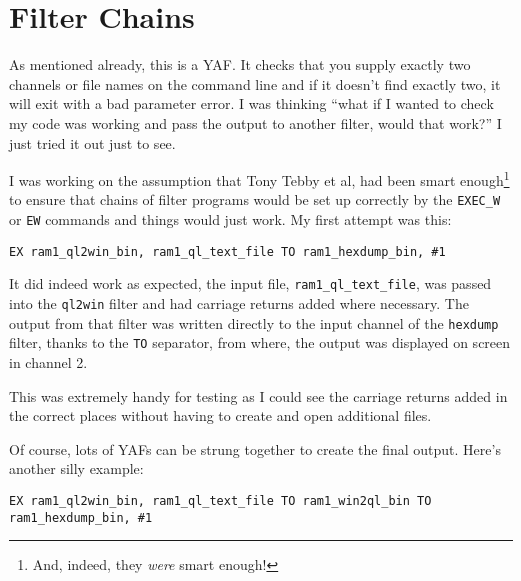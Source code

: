 \section{Filter Chains}

As mentioned already, this is a YAF. It checks that you supply exactly
two channels or file names on the command line and if it doesn't find
exactly two, it will exit with a bad parameter error. I was thinking
``what if I wanted to check my code was working and pass the output
to another filter, would that work?'' I just tried it out just to
see. 

I was working on the assumption that Tony Tebby et al, had been smart
enough\footnote{And, indeed, they \emph{were} smart enough!} to ensure
that chains of filter programs would be set up correctly by the \lstinline[basicstyle={\ttfamily},showstringspaces=false]!EXEC_W!
or \lstinline[basicstyle={\ttfamily},showstringspaces=false]!EW!
commands and things would just work. My first attempt was this:

\begin{lstlisting}[basicstyle={\ttfamily},showstringspaces=false,tabsize=1,numbers=none]
EX ram1_ql2win_bin, ram1_ql_text_file TO ram1_hexdump_bin, #1
\end{lstlisting}

It did indeed work as expected, the input file, \lstinline[basicstyle={\ttfamily},showstringspaces=false,breaklines=false]!ram1_ql_text_file!,
was passed into the \lstinline[basicstyle={\ttfamily},showstringspaces=false]!ql2win!
filter and had carriage returns added where necessary. The output
from that filter was written directly to the input channel of the
\lstinline[basicstyle={\ttfamily},showstringspaces=false]!hexdump!
filter, thanks to the \lstinline[basicstyle={\ttfamily},showstringspaces=false]!TO!
separator, from where, the output was displayed on screen in channel
2.

This was extremely handy for testing as I could see the carriage returns
added in the correct places without having to create and open additional
files.

Of course, lots of YAFs can be strung together to create the final
output. Here's another silly example:

\begin{lstlisting}[basicstyle={\ttfamily},showstringspaces=false,tabsize=1,numbers=none]
EX ram1_ql2win_bin, ram1_ql_text_file TO ram1_win2ql_bin TO ram1_hexdump_bin, #1
\end{lstlisting}

